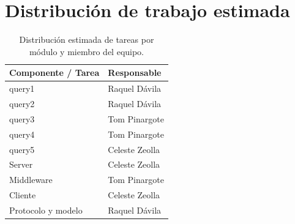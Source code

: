 
\section{Distribución de trabajo estimada}

\begin{table}[htbp]
  \centering
  \begin{tabular}{|l|l|}
    \hline
    \textbf{Componente / Tarea} & \textbf{Responsable} \\ \hline
    query1 & Raquel Dávila \\ \hline
    query2 & Raquel Dávila  \\ \hline
    query3 & Tom Pinargote \\ \hline
    query4 & Tom Pinargote \\ \hline
    query5 & Celeste Zeolla \\ \hline
    Server & Celeste Zeolla \\ \hline
    Middleware & Tom Pinargote \\ \hline
    Cliente & Celeste Zeolla \\ \hline
    Protocolo y modelo & Raquel Dávila  \\ \hline
  \end{tabular}
  \caption{Distribución estimada de tareas por módulo y miembro del equipo.}
  \label{tab:distribucion_trabajo}
\end{table}